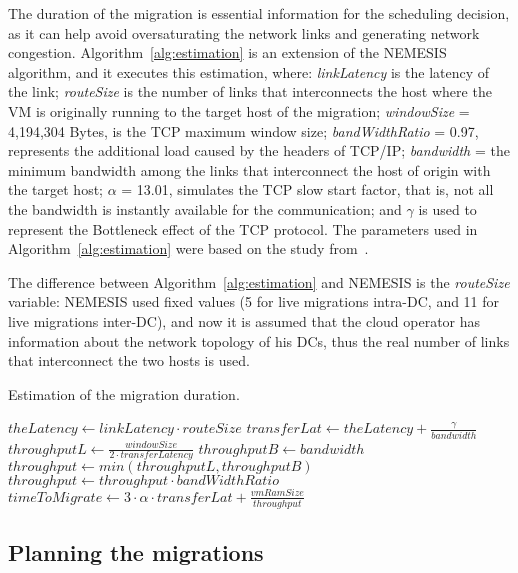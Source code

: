 The duration of the migration is essential information for the scheduling decision, as it can help avoid oversaturating the network links and generating network congestion. Algorithm~\ref{alg:estimation} is an extension of the NEMESIS algorithm, and it executes this estimation, where: \textit{linkLatency} is the latency of the link; \textit{routeSize} is the number of links that interconnects the host where the VM is originally running to the target host of the migration; \mbox{\textit{windowSize}} = 4,194,304 Bytes, is the TCP maximum window size; \textit{bandWidthRatio} = 0.97, represents the additional load caused by the headers of TCP/IP; \textit{bandwidth} = the minimum bandwidth among the links that interconnect the host of origin with the target host; $\alpha$ = 13.01, simulates the TCP slow start factor, that is, not all the bandwidth is instantly available for the communication; and $\gamma$ is used to represent the Bottleneck effect of the TCP protocol. The parameters used in Algorithm~\ref{alg:estimation} were based on the study from~\citet{velho2013simgridparameters}. 

The difference between Algorithm~\ref{alg:estimation}  and NEMESIS is the \textit{routeSize} variable: NEMESIS used fixed values (5 for live migrations intra-DC, and 11 for live migrations inter-DC), and now it is assumed that the cloud operator has information about the network topology of his DCs, thus the real number of links that interconnect the two hosts is used.

\begin{algorithm}[h]
\begin{algorithmic}
\caption{Estimation of the migration duration.}\label{alg:estimation}
\State $theLatency \gets linkLatency \cdot routeSize$
\State $transferLat \gets theLatency + \frac{\gamma}{bandwidth}$
\State $throughputL \gets \frac{windowSize}{2 \cdot transferLatency}$
\State $throughputB \gets bandwidth$
\State $throughput \gets min(throughputL, throughputB)$
\State $throughput \gets throughput 
\cdot bandWidthRatio$
\State $timeToMigrate \gets  3 \cdot \alpha \cdot transferLat + \frac{vmRamSize}{throughput}$ 
\end{algorithmic}
\end{algorithm}

\subsection{Planning the migrations}
\label{sec:planning_migrations}


